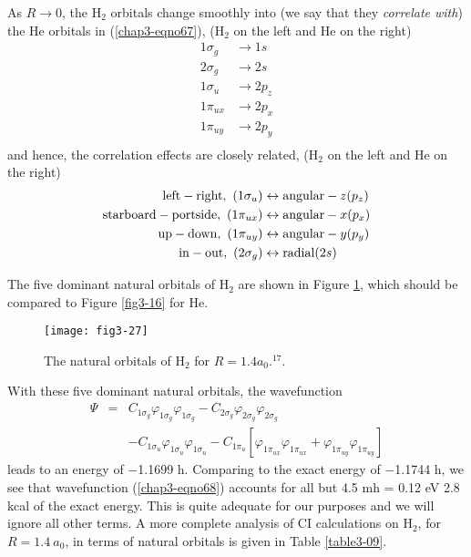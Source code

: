 \noindent
As $R \rightarrow 0$, the H$_2$ orbitals change smoothly into (we say
that they \emph{correlate with}) the He orbitals in
(\ref{chap3-eqno67}), (H$_2$ on the left and He on the right)
\begin{eqnarray}
1 \sigma_g & \rightarrow 1s\\
2 \sigma_g & \rightarrow 2s\\
1 \sigma_u & \rightarrow 2p_z\\
1 \pi_{ux} & \rightarrow 2p_x\\
1 \pi_{uy} & \rightarrow 2p_y\\
\end{eqnarray}
and hence, the correlation effects are closely related, (H$_2$ on the
left and He on the right)
\begin{eqnarray}
{\rm left} - {\rm right} , ~ (1 \sigma_u) & \leftrightarrow {\rm 
angular}-z (p_z)\\
{\rm starboard} - {\rm portside} , ~ (1 \pi_{ux}) & \leftrightarrow {\rm 
angular}-x (p_x)\\
{\rm up} - {\rm down} , ~ (1 \pi_{uy}) & \leftrightarrow {\rm
  angular}-y (p_y)\\
{\rm in} - {\rm out} , ~ (2 \sigma_g) & \leftrightarrow {\rm radial}  
(2s)\\
\end{eqnarray}

The five dominant natural orbitals of H$_2$ are shown in Figure
\ref{fig3-28}, which should be compared to Figure \ref{fig3-16} for He.

\begin{figure}
\texttt{[image: fig3-27]}
\caption{The natural orbitals of H$_2$ for $R = 1.4a_0$.$^{17}$.}
\label{fig3-28}
\end{figure}


With these five dominant natural orbitals, the wavefunction
\begin{eqnarray}
\Psi &=& C_{1 \sigma_g} \varphi_{1 \sigma_g} \varphi_{1 \sigma_g} - C_{2 
\sigma_g} \varphi_{2 \sigma_g} \varphi_{2 \sigma_g}\\ \nonumber
     && - C_{1 \sigma_u} 
\varphi_{1 \sigma_u} \varphi_{1 \sigma_u} - C_{1 \pi_u} \left[ \varphi_{1 
\pi_{ux}} \varphi_{1 \pi_{ux}} + \varphi_{1 \pi_{uy}} \varphi_{1 \pi_{uy}} 
\right]
\label{chap3-eqno68}
\end{eqnarray}
leads to an energy of $-$1.1699 h.  Comparing to the exact energy of
$-$1.1744 h, we see that wavefunction (\ref{chap3-eqno68}) accounts for
all but 4.5 mh = 0.12 eV 2.8 kcal of the exact energy. This is quite
adequate for our purposes and we will ignore all other terms. A more
complete analysis \cite{chap3-ref18} of CI calculations on H$_2$, for
$R = 1.4\ a_0$, in terms of natural orbitals is given in Table
\ref{table3-09}.


